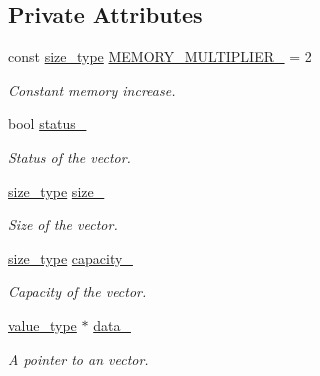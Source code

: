 \subsection*{Private Attributes}
\begin{DoxyCompactItemize}
\item 
\mbox{\label{classatom_1_1vector__t_a9ad3283ba0a42acb2e7170e9bc4d45b4}} 
const \hyperlink{classatom_1_1vector__t_a1790d79321f4fa8d2580474dd0f56033}{size\+\_\+type} \hyperlink{classatom_1_1vector__t_a9ad3283ba0a42acb2e7170e9bc4d45b4}{M\+E\+M\+O\+R\+Y\+\_\+\+M\+U\+L\+T\+I\+P\+L\+I\+E\+R\+\_\+} = 2
\begin{DoxyCompactList}\small\item\em Constant memory increase. \end{DoxyCompactList}\item 
\mbox{\label{classatom_1_1vector__t_a65beae11fccd858f2654f58d2bd1cc0a}} 
bool \hyperlink{classatom_1_1vector__t_a65beae11fccd858f2654f58d2bd1cc0a}{status\+\_\+}
\begin{DoxyCompactList}\small\item\em Status of the vector. \end{DoxyCompactList}\item 
\mbox{\label{classatom_1_1vector__t_a29dff51a861116c432c2f1ee90801a76}} 
\hyperlink{classatom_1_1vector__t_a1790d79321f4fa8d2580474dd0f56033}{size\+\_\+type} \hyperlink{classatom_1_1vector__t_a29dff51a861116c432c2f1ee90801a76}{size\+\_\+}
\begin{DoxyCompactList}\small\item\em Size of the vector. \end{DoxyCompactList}\item 
\mbox{\label{classatom_1_1vector__t_a6a9ead361729a5b20e4461591865ce4c}} 
\hyperlink{classatom_1_1vector__t_a1790d79321f4fa8d2580474dd0f56033}{size\+\_\+type} \hyperlink{classatom_1_1vector__t_a6a9ead361729a5b20e4461591865ce4c}{capacity\+\_\+}
\begin{DoxyCompactList}\small\item\em Capacity of the vector. \end{DoxyCompactList}\item 
\mbox{\label{classatom_1_1vector__t_a064e615ddc1f70082d573d45f8e5df00}} 
\hyperlink{classatom_1_1vector__t_a558283a4fed53856d445ceb61ac96d94}{value\+\_\+type} $\ast$ \hyperlink{classatom_1_1vector__t_a064e615ddc1f70082d573d45f8e5df00}{data\+\_\+}
\begin{DoxyCompactList}\small\item\em A pointer to an vector. \end{DoxyCompactList}\end{DoxyCompactItemize}


